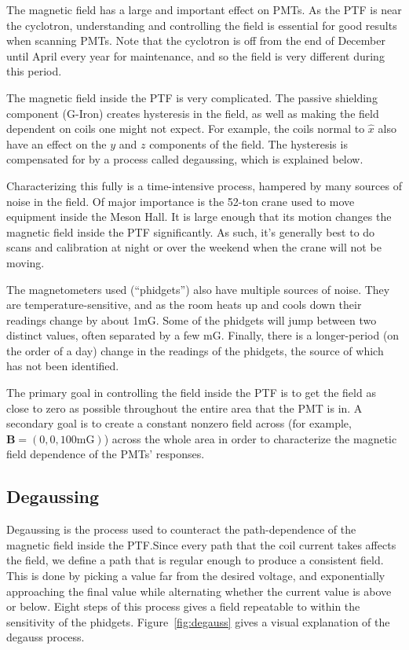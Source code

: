 \documentclass[twoside,letterpaper]{refart}
\begin{document}
The magnetic field has a large and important effect on PMTs. As the PTF is near the cyclotron, understanding and controlling the field is essential for good results when scanning PMTs. Note that the cyclotron is off from the end of December until April every year for maintenance, and so the field is very different during this period.

The magnetic field inside the PTF is very complicated. The passive shielding component (G-Iron) creates hysteresis in the field, as well as making the field dependent on coils one might not expect. For example, the coils normal to $\hat{x}$ also have an effect on the $y$ and $z$ components of the field. The hysteresis is compensated for by a process called degaussing, which is explained below.

Characterizing this fully is a time-intensive process, hampered by many sources of noise in the field. Of major importance is the 52-ton crane used to move equipment inside the Meson Hall. It is large enough that its motion changes the magnetic field inside the PTF significantly. As such, it's generally best to do scans and calibration at night or over the weekend when the crane will not be moving.

The magnetometers used (``phidgets'') also have multiple sources of noise. They are temperature-sensitive, and as the room heats up and cools down their readings change by about 1mG. Some of the phidgets will jump between two distinct values, often separated by a few mG. Finally, there is a longer-period (on the order of a day) change in the readings of the phidgets, the source of which has not been identified.

The primary goal in controlling the field inside the PTF is to get the field as close to zero as possible throughout the entire area that the PMT is in. A secondary goal is to create a constant nonzero field across (for example, $\mathbf{B} = \left( 0, 0, 100\text{mG} \right)$) across the whole area in order to characterize the magnetic field dependence of the PMTs' responses.

\subsection{Degaussing}

Degaussing is the process used to counteract the path-dependence of the magnetic field inside the PTF.\@ Since every path that the coil current takes affects the field, we define a path that is regular enough to produce a consistent field. This is done by picking a value far from the desired voltage, and exponentially approaching the final value while alternating whether the current value is above or below. Eight steps of this process gives a field repeatable to within the sensitivity of the phidgets. Figure~\ref{fig:degauss} gives a visual explanation of the degauss process.
\end{document}

